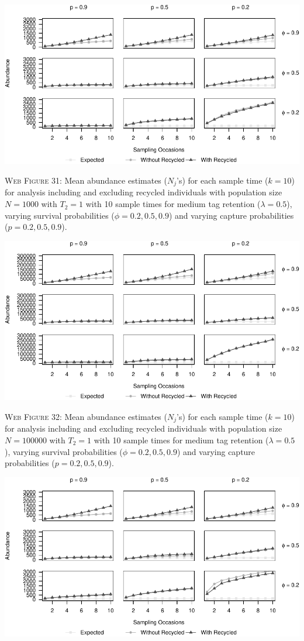 \documentclass[]{article}
\begin{document}
\newpage

\includegraphics{Appendix_BW_files/figure-latex/31_abundance_M_GJSTL1-1.pdf}

\textsc{Web Figure 31:} Mean abundance estimates (\(N_j\)'s) for each
sample time (\(k=10\)) for analysis including and excluding recycled
individuals with population size \(N=1000\) with \(T_2=1\) with 10 sample times
for medium tag retention (\(\lambda=0.5\)), varying survival
probabilities (\(\phi=0.2,0.5,0.9\)) and varying capture probabilities
(\(p=0.2,0.5,0.9\)).

\includegraphics{Appendix_BW_files/figure-latex/32_abundance_M_GJSTL2-1.pdf}

\textsc{Web Figure 32:} Mean abundance estimates (\(N_j\)'s) for each
sample time (\(k=10\)) for analysis including and excluding recycled
individuals with population size \(N=100000\) with \(T_2=1\) with 10
sample times for medium tag retention (\(\lambda=0.5\)), varying
survival probabilities (\(\phi=0.2,0.5,0.9\)) and varying capture
probabilities (\(p=0.2,0.5,0.9\)).

\newpage

\includegraphics{Appendix_BW_files/figure-latex/33_abundance_M_GJSTL4-1.pdf}
\end{document}
